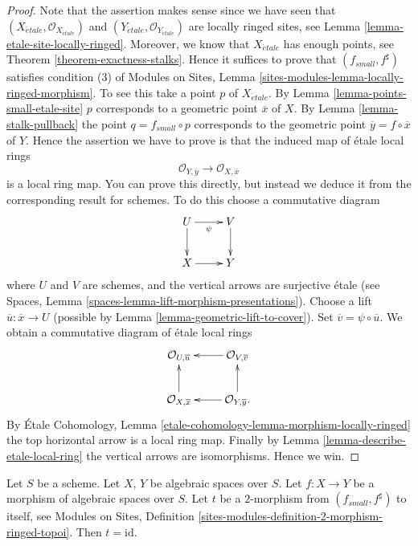 \begin{proof}
Note that the assertion makes sense since we have seen that
$(X_{\acute{e}tale}, \mathcal{O}_{X_{\acute{e}tale}})$ and
$(Y_{\acute{e}tale}, \mathcal{O}_{Y_{\acute{e}tale}})$
are locally ringed sites, see
Lemma \ref{lemma-etale-site-locally-ringed}.
Moreover, we know that $X_{\acute{e}tale}$ has enough points, see
Theorem \ref{theorem-exactness-stalks}.
Hence it suffices to prove that $(f_{small}, f^\sharp)$
satisfies condition (3) of
Modules on Sites,
Lemma \ref{sites-modules-lemma-locally-ringed-morphism}.
To see this take a point $p$ of $X_{\acute{e}tale}$. By
Lemma \ref{lemma-points-small-etale-site}
$p$ corresponds to a geometric point $\overline{x}$ of $X$.
By
Lemma \ref{lemma-stalk-pullback}
the point $q = f_{small} \circ p$ corresponds to the
geometric point $\overline{y} = f \circ \overline{x}$ of $Y$.
Hence the assertion we have to prove is that the induced map
of \'etale local rings
$$
\mathcal{O}_{Y, \overline{y}} \longrightarrow \mathcal{O}_{X, \overline{x}}
$$
is a local ring map. You can prove this directly, but instead we deduce it
from the corresponding result for schemes. To do this choose a commutative
diagram
$$
\xymatrix{
U \ar[d] \ar[r]_\psi & V \ar[d] \\
X \ar[r] & Y
}
$$
where $U$ and $V$ are schemes, and the vertical arrows are surjective
\'etale (see
Spaces, Lemma \ref{spaces-lemma-lift-morphism-presentations}).
Choose a lift $\overline{u} : \overline{x} \to U$ (possible by
Lemma \ref{lemma-geometric-lift-to-cover}).
Set $\overline{v} = \psi \circ \overline{u}$. We obtain a commutative
diagram of \'etale local rings
$$
\xymatrix{
\mathcal{O}_{U, \overline{u}} &
\mathcal{O}_{V, \overline{v}} \ar[l] \\
\mathcal{O}_{X, \overline{x}} \ar[u] &
\mathcal{O}_{Y, \overline{y}}. \ar[l] \ar[u]
}
$$
By
\'Etale Cohomology, Lemma \ref{etale-cohomology-lemma-morphism-locally-ringed}
the top horizontal arrow is a local ring map. Finally by
Lemma \ref{lemma-describe-etale-local-ring}
the vertical arrows are isomorphisms. Hence we win.
\end{proof}

\begin{lemma}
\label{lemma-2-morphism}
Let $S$ be a scheme.
Let $X$, $Y$ be algebraic spaces over $S$.
Let $f : X \to Y$ be a morphism of algebraic spaces over $S$.
Let $t$ be a $2$-morphism from $(f_{small}, f^\sharp)$ to itself, see
Modules on Sites,
Definition \ref{sites-modules-definition-2-morphism-ringed-topoi}.
Then $t = \text{id}$.
\end{lemma}

